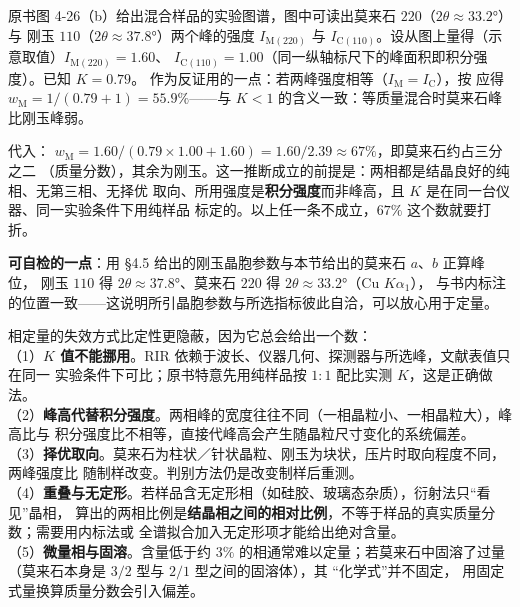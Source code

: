 \begin{example}
\begin{obs}
原书图 4-26（b）给出混合样品的实验图谱，图中可读出莫来石 $220$（$2\theta\approx33.2°$）与
刚玉 $110$（$2\theta\approx37.8°$）两个峰的强度 $I_{\mathrm{M}(220)}$ 与
$I_{\mathrm{C}(110)}$。设从图上量得（示意取值）$I_{\mathrm{M}(220)}=1.60$、
$I_{\mathrm{C}(110)}=1.00$（同一纵轴标尺下的峰面积即积分强度）。已知 $K=0.79$。
作为反证用的一点：若两峰强度相等（$I_{\mathrm{M}}=I_{\mathrm{C}}$），按
应得 $w_{\mathrm{M}}=1/(0.79+1)=55.9\%$——与 $K<1$ 的含义一致：等质量混合时莫来石峰比刚玉峰弱。
\end{obs}
\begin{infer}
代入：
$w_{\mathrm{M}}=1.60/(0.79\times1.00+1.60)=1.60/2.39\approx67\%$，即莫来石约占三分之二
（质量分数），其余为刚玉。这一推断成立的前提是：两相都是结晶良好的纯相、无第三相、无择优
取向、所用强度是\textbf{积分强度}而非峰高，且 $K$ 是在同一台仪器、同一实验条件下用纯样品
标定的。以上任一条不成立，$67\%$ 这个数就要打折。
\end{infer}
\textbf{可自检的一点}：用 §4.5 给出的刚玉晶胞参数与本节给出的莫来石 $a$、$b$ 正算峰位，
刚玉 $110$ 得 $2\theta\approx37.8°$、莫来石 $220$ 得 $2\theta\approx33.2°$（Cu $K\alpha_{1}$），
与书内标注的位置一致——这说明所引晶胞参数与所选指标彼此自洽，可以放心用于定量。
\end{example}

\begin{pitfall}
相定量的失效方式比定性更隐蔽，因为它总会给出一个数：\\
（1）\textbf{$K$ 值不能挪用}。RIR 依赖于波长、仪器几何、探测器与所选峰，文献表值只在同一
实验条件下可比；原书特意先用纯样品按 $1:1$ 配比实测 $K$，这是正确做法。\\
（2）\textbf{峰高代替积分强度}。两相峰的宽度往往不同（一相晶粒小、一相晶粒大），峰高比与
积分强度比不相等，直接代峰高会产生随晶粒尺寸变化的系统偏差。\\
（3）\textbf{择优取向}。莫来石为柱状／针状晶粒、刚玉为块状，压片时取向程度不同，两峰强度比
随制样改变。判别方法仍是改变制样后重测。\\
（4）\textbf{重叠与无定形}。若样品含无定形相（如硅胶、玻璃态杂质），衍射法只``看见''晶相，
算出的两相比例是\textbf{结晶相之间的相对比例}，不等于样品的真实质量分数；需要用内标法或
全谱拟合加入无定形项才能给出绝对含量。\\
（5）\textbf{微量相与固溶}。含量低于约 $3\%$ 的相通常难以定量；若莫来石中固溶了过量
（莫来石本身是 $3/2$ 型与 $2/1$ 型之间的固溶体），其 ``化学式''并不固定，
用固定式量换算质量分数会引入偏差。
\end{pitfall}


